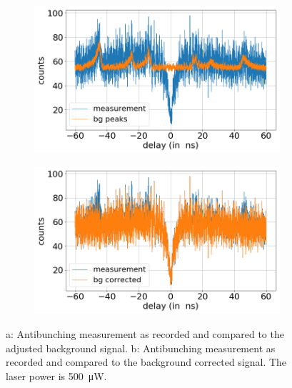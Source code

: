 \begin{figure}[!ht]
    \centering
    \begin{subfigure}{0.47\textwidth}
        \centering
        \includegraphics[width=1.0\textwidth]{img/output_t2/500.0muW_bg_peaks.png}
    \caption{}
    \end{subfigure}
    \begin{subfigure}{0.47\textwidth}
        \centering
        \includegraphics[width=\textwidth]{img/output_t2/500.0muW_bg_vgl.png}
        \caption{}
    \end{subfigure}
    \caption{a: Antibunching measurement as recorded and compared to the adjusted background signal. b: Antibunching measurement as recorded and compared to the background corrected signal. The laser power is \SI{500}{\micro W}.} %
\end{figure}
